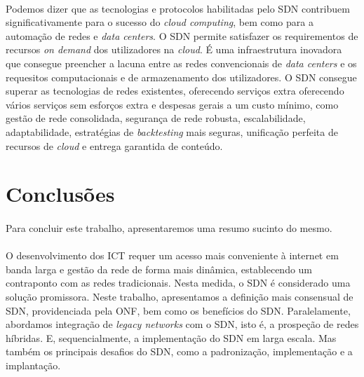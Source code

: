 \documentclass{llncs}
\begin{document}
\paragraph{}
Podemos dizer que as tecnologias e protocolos habilitadas pelo SDN contribuem significativamente para o sucesso do \textit {cloud computing}, bem como para a automação de redes e \textit {data centers}. O SDN permite satisfazer os requirementos de recursos \textit{on demand} dos utilizadores na \textit{cloud}. 
É uma infraestrutura inovadora que consegue preencher a lacuna entre as redes convencionais de \textit{data centers} e os requesitos computacionais e de armazenamento dos utilizadores.
O SDN consegue superar as tecnologias de redes existentes, oferecendo serviços extra oferecendo vários serviços sem esforços extra e despesas gerais a um custo mínimo, como gestão de rede consolidada, segurança de rede robusta, escalabilidade, adaptabilidade, estratégias de \textit {backtesting} mais seguras, unificação perfeita de recursos de \textit{cloud} e entrega garantida de conteúdo.

\section{Conclusões}
\paragraph{}
Para concluir este trabalho, apresentaremos uma resumo sucinto do mesmo.
\paragraph{}
O desenvolvimento dos ICT requer um acesso mais conveniente à internet em banda larga e gestão da rede de forma mais dinâmica, establecendo um contraponto com as redes tradicionais. 
Nesta medida, o SDN é considerado uma solução promissora. Neste trabalho, apresentamos a definição mais consensual de SDN, providenciada pela ONF, bem como os benefícios do SDN. 
Paralelamente, abordamos integração de \textit{legacy networks} com o SDN, isto é, a prospeção de redes híbridas. 
E, sequencialmente, a implementação do SDN em larga escala.
Mas também os principais desafios do SDN, como a padronização, implementação e a implantação.

\printbibliography
\end{document}
